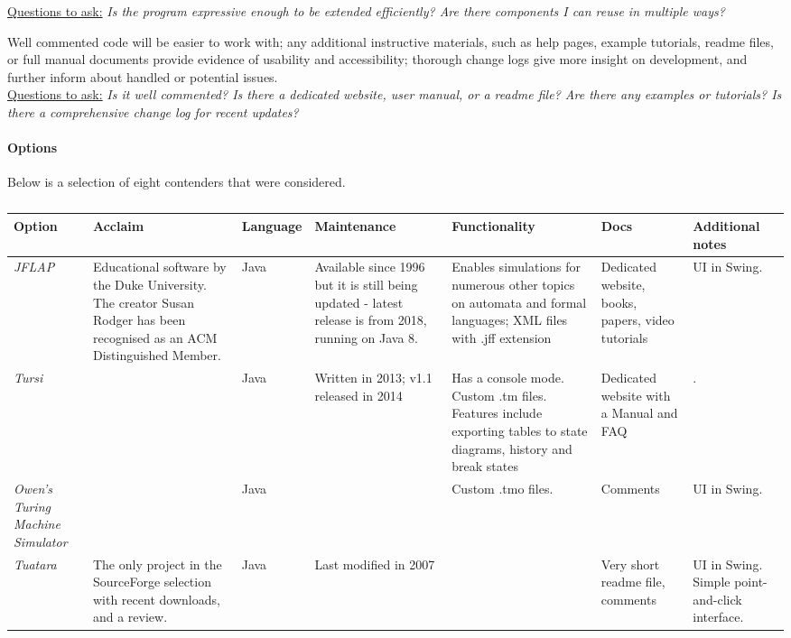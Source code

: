 \documentclass[12pt,a4,xcolor=table]{article}
\begin{document}
{\begin{description}
		\underline{Questions to ask:} \textit{Is the program expressive enough to be extended efficiently? Are there components I can reuse in multiple ways?}
		\item[Documentation] Well commented code will be easier to work with; any additional instructive materials, such as help pages, example tutorials, readme files, or full manual documents provide evidence of usability and accessibility; thorough change logs give more insight on development, and further inform about handled or potential issues.\\
		\underline{Questions to ask:} \textit{Is it well commented? Is there a dedicated website, user manual, or a readme file? Are there any examples or tutorials? Is there a comprehensive change log for recent updates?}
	\end{description}
	\paragraph{Options}
	Below is a selection of eight contenders that were considered.
	\begin{table}[]
		\centering
		\caption{}
		\label{table:open-source} 
		\footnotesize
		\begin{tabular}{|m{0.73in} |m{1in}|m{0.6in}|m{0.9in}|m{1in}|m{0.5in}|m{1in}|}
			\hline
			\textbf{Option} & \textbf{Acclaim} & \textbf{Language} & \textbf{Maintenance} & \textbf{Functionality} & \textbf{Docs} & \textbf{Additional notes} \\ \hline
			\textit{JFLAP} & Educational software by the Duke University. The creator Susan Rodger has been recognised as an ACM Distinguished Member. & Java & Available since 1996 but it is still being updated - latest release is from 2018, running on Java 8.  &  Enables simulations for numerous other topics on automata and formal languages; XML files with .jff extension & Dedicated website, books, papers, video tutorials & UI in Swing. \\ \hline
			\textit{Tursi} &  & Java & Written in 2013; v1.1 released in 2014 & Has a console mode. Custom .tm files. Features include exporting tables to state diagrams, history and break states & Dedicated website with a Manual and FAQ & . \\ \hline
			\textit{Owen's Turing Machine Simulator} &  & Java &  & Custom .tmo files. & Comments &  UI in Swing. \\ \hline
			\textit{Tuatara} & The only project in the SourceForge selection with recent downloads, and a review.  & Java & Last modified in 2007  &  & Very short readme file, comments & UI in Swing. Simple point-and-click interface.  \\ \hline

\end{tabular}
\end{table}}
\end{document}
